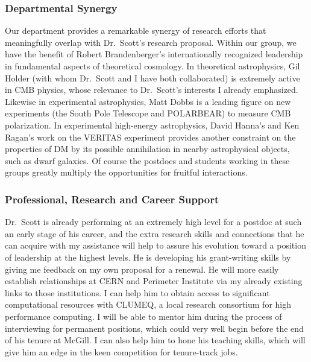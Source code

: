 \documentclass[12pt]{article}
\begin{document}
\subsubsection*{Departmental Synergy}

Our department provides a remarkable synergy of research efforts that
meaningfully overlap with Dr.\ Scott's research proposal. Within our
group, we have the
benefit of Robert Brandenberger's internationally recognized
leadership in fundamental aspects of theoretical cosmology.  In theoretical astrophysics, Gil Holder (with whom Dr.\ Scott
and I have both collaborated) is extremely active in CMB physics,
whose relevance to Dr.\ Scott's interests I already emphasized.
Likewise in experimental astrophysics, Matt Dobbs is a leading figure
on new experiments (the South Pole Telescope and POLARBEAR) to measure
CMB polarization.  In experimental high-energy astrophysics, David
Hanna's and Ken Ragan's work on the VERITAS experiment provides
another constraint on the properties of DM by its possible
annihilation in nearby astrophysical objects, such as dwarf galaxies.  Of course the postdocs and
students working in these groups greatly multiply the opportunities for
fruitful interactions.

\subsubsection*{Professional, Research and Career Support}

Dr.\ Scott is already performing at an extremely high level for a
postdoc at such an early stage of his career, and the extra research
skills and connections that he can acquire with my assistance will
help to assure his evolution toward a position of leadership at the
highest levels.  He is developing his grant-writing skills by giving
me feedback on my own proposal for a renewal.  He will more easily
establish relationships at CERN and Perimeter Institute via my already
existing links to those institutions.  I can help him to obtain access
to significant computational resources with CLUMEQ, a local
research consortium for high performance computing.  I will be able to
mentor him during the process of interviewing for permanent positions,
which could very well begin before the end of his tenure at McGill.
I can also help him to hone his teaching skills, which will give him an edge
in the keen competition for tenure-track jobs.
\end{document}
